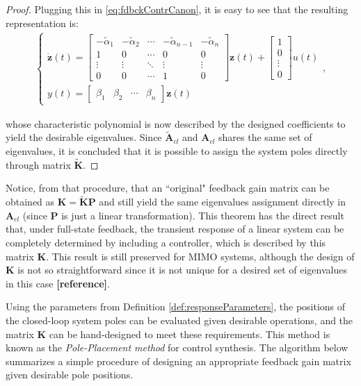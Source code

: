 \documentclass[a4paper,11pt]{book}
\numberwithin{figure}{chapter}
\numberwithin{equation}{chapter}
\numberwithin{table}{chapter}
\theoremstyle{definition}
\begin{document}
\begin{proof}
    Plugging this in \eqref{eq:fdbckContrCanon}, it is easy to see that the resulting representation is:
    \begin{align} \label{eq:SSFdbckControlCanon}
    \begin{cases}
        \dot{\bm{z}}(t) = \begin{bmatrix}
            -\tilde{\alpha}_1 & -\tilde{\alpha}_2 & \cdots & -\tilde{\alpha}_{n-1} & -\tilde{\alpha}_n \\
            1 & 0 & \cdots & 0 & 0 \\
            \vdots & \vdots & \ddots & \vdots & \vdots \\
            0 & 0 & \cdots & 1 & 0 
        \end{bmatrix} \bm{z}(t) + \begin{bmatrix}
            1 \\ 0 \\ \vdots \\ 0
        \end{bmatrix} u(t) \\
        y(t) = \begin{bmatrix} \beta_1 & \beta_2 & \cdots & \beta_n \end{bmatrix} \bm{z}(t)
    \end{cases}
    ,\end{align} 
    
    \noindent whose characteristic polynomial is now described by the designed coefficients to yield the desirable eigenvalues. Since $\tilde{\bm{A}}_{cl}$ and $\bm{A}_{cl}$ shares the same set of eigenvalues, it is concluded that it is possible to assign the system poles directly through matrix $\tilde{\bm{K}}$.
\end{proof}

Notice, from that procedure, that an ``original" feedback gain matrix can be obtained as $\bm{K} = \tilde{\bm{K}} \bm{P}$ and still yield the same eigenvalues assignment directly in $\bm{A}_{cl}$ (since $\bm{P}$ is just a linear transformation). This theorem has the direct result that, under full-state feedback, the transient response of a linear system can be completely determined by including a controller, which is described by this matrix $\bm{K}$. This result is still preserved for MIMO systems, although the design of $\bm{K}$ is not so straightforward since it is not unique for a desired set of eigenvalues in this case \textbf{[reference]}. 

Using the parameters from Definition \ref{def:responseParameters}, the positions of the closed-loop system poles can be evaluated given desirable operations, and the matrix $\bm{K}$ can be hand-designed to meet these requirements. This method is known as the \textit{Pole-Placement method} for control synthesis. The algorithm below summarizes a simple procedure of designing an appropriate feedback gain matrix given desirable pole positions.
\end{document}
